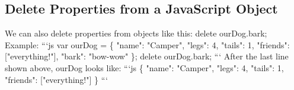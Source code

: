 \documentclass{article}%
\begin{document}
%
\subsection{Delete Properties from a JavaScript Object}%
\label{subsec:DeletePropertiesfromaJavaScriptObject}%
We can also delete properties from objects like this:\newline%
delete ourDog.bark;\newline%
Example:\newline%
```js\newline%
var ourDog = \{\newline%
  "name": "Camper",\newline%
  "legs": 4,\newline%
  "tails": 1,\newline%
  "friends": {[}"everything!"{]},\newline%
  "bark": "bow{-}wow"\newline%
\};\newline%
delete ourDog.bark;\newline%
```\newline%
After the last line shown above, ourDog looks like:\newline%
```js\newline%
\{\newline%
  "name": "Camper",\newline%
  "legs": 4,\newline%
  "tails": 1,\newline%
  "friends": {[}"everything!"{]}\newline%
\}\newline%
```\newline%

%
\end{document}
